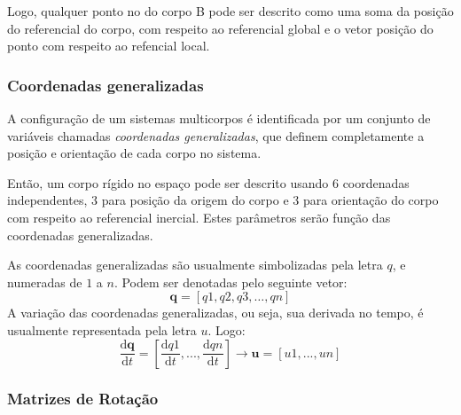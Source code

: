 Logo, qualquer ponto no do corpo B pode ser descrito como uma soma da posição do
referencial do corpo, com respeito ao referencial global e o vetor posição do
ponto com respeito ao refencial local.


\subsubsection{Coordenadas generalizadas}

A configuração de um sistemas multicorpos é identificada por um conjunto de
variáveis chamadas \emph{coordenadas generalizadas}, que definem completamente a
posição e orientação de cada corpo no sistema.

Então, um corpo rígido no espaço pode ser descrito usando 6 coordenadas
independentes, 3 para posição da origem do corpo e 3 para orientação do corpo
com respeito ao referencial inercial. Estes parâmetros serão função das
coordenadas generalizadas.

As coordenadas generalizadas são usualmente simbolizadas pela letra
$q$, e numeradas de $1$ a $n$. Podem ser denotadas pelo seguinte vetor:
%
\begin{equation}
	\mathbf{q} = [q1, q2, q3,\ldots, qn]
\end{equation}
%
A variação das coordenadas generalizadas, ou seja, sua derivada no tempo, é
usualmente representada pela letra $u$. Logo:
%
\begin{equation}
	\frac{\mathrm{d} \mathbf{q}}{\mathrm{d} t} = \left[ \frac{\mathrm{d}
q1}{\mathrm{d} t}, ..., \frac{\mathrm{d} qn}{\mathrm{d} t}\right] \rightarrow  \mathbf{u} = [u1,...,un]
\end{equation}
%




\subsubsection{Matrizes de Rotação}

